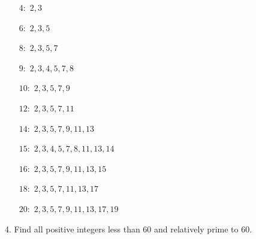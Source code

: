 \begin{mdframed}[style=darkAnswer,frametitle={Joe Starr}]
  \begin{multicols}{1}
    \begin{itemize}
      \item[$4:$]  {$2, 3$}
      \item[$6:$]  {$2, 3, 5$}
      \item[$8:$]  {$2, 3, 5, 7$}
      \item[$9:$]  {$2, 3, 4, 5, 7, 8$}
      \item[$10:$] {$2, 3, 5, 7, 9$}
      \item[$12:$] {$2, 3, 5, 7, 11$}
      \item[$14:$] {$2, 3, 5, 7, 9, 11, 13$}
      \item[$15:$] {$2, 3, 4, 5, 7, 8, 11, 13, 14$}
      \item[$16:$] {$2, 3, 5, 7, 9, 11, 13, 15$}
      \item[$18:$] {$2, 3, 5, 7, 11, 13, 17$}
      \item[$20:$] {$2, 3, 5, 7, 9, 11, 13, 17, 19$}
    \end{itemize}
  \end{multicols}
\end{mdframed}
\newpage
\begin{mdframed}[style=darkQuesion]
  4. Find all positive integers less than 60 and relatively prime to $60$.
\end{mdframed}

